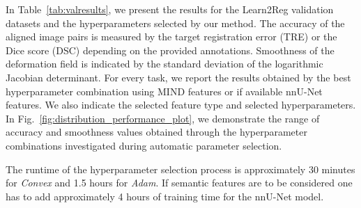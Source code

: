 In Table~\ref{tab:valresults}, we present the results for the Learn2Reg validation datasets and the hyperparameters selected by our method. The accuracy of the aligned image pairs is measured by the target registration error (TRE) or the Dice score (DSC) depending on the provided annotations. Smoothness of the deformation field is indicated by the standard deviation of the logarithmic Jacobian determinant. For every task, we report the results obtained by the best hyperparameter combination using MIND features or if available nnU-Net features. We also indicate the selected feature type and selected hyperparameters. In Fig.~\ref{fig:distribution_performance_plot}, we demonstrate the range of accuracy and smoothness values obtained through the hyperparameter combinations investigated during automatic parameter selection. %

The runtime of the hyperparameter selection process is approximately 30 minutes for \emph{Convex} and 1.5 hours for \emph{Adam}. If semantic features are to be considered one has to add approximately 4 hours of training time for the nnU-Net model.




\FloatBarrier

